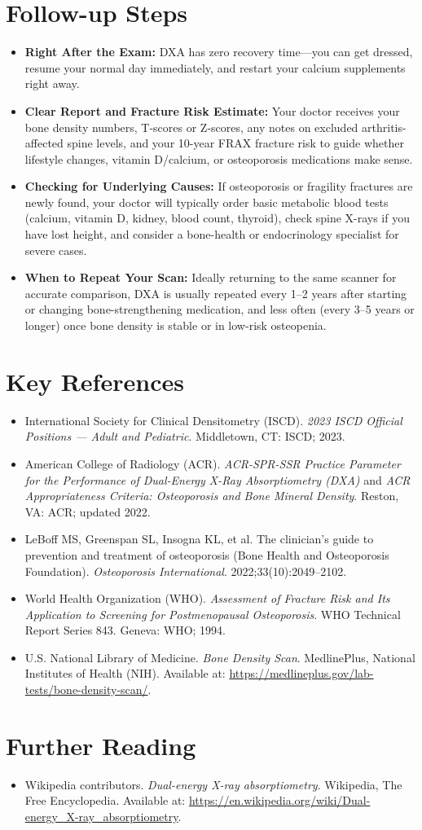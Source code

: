 \section{Follow-up Steps}
\begin{itemize}
\item \textbf{Right After the Exam:} DXA has zero recovery time---you can get dressed, resume your normal day immediately, and restart your calcium supplements right away.
\item \textbf{Clear Report and Fracture Risk Estimate:} Your doctor receives your bone density numbers, T-scores or Z-scores, any notes on excluded arthritis-affected spine levels, and your 10-year FRAX fracture risk to guide whether lifestyle changes, vitamin D/calcium, or osteoporosis medications make sense.
\item \textbf{Checking for Underlying Causes:} If osteoporosis or fragility fractures are newly found, your doctor will typically order basic metabolic blood tests (calcium, vitamin D, kidney, blood count, thyroid), check spine X-rays if you have lost height, and consider a bone-health or endocrinology specialist for severe cases.
\item \textbf{When to Repeat Your Scan:} Ideally returning to the same scanner for accurate comparison, DXA is usually repeated every 1--2 years after starting or changing bone-strengthening medication, and less often (every 3--5 years or longer) once bone density is stable or in low-risk osteopenia.
\end{itemize}

\section{Key References}
\begin{itemize}
\item International Society for Clinical Densitometry (ISCD). \textit{2023 ISCD Official Positions --- Adult and Pediatric}. Middletown, CT: ISCD; 2023.
\item American College of Radiology (ACR). \textit{ACR-SPR-SSR Practice Parameter for the Performance of Dual-Energy X-Ray Absorptiometry (DXA)} and \textit{ACR Appropriateness Criteria: Osteoporosis and Bone Mineral Density}. Reston, VA: ACR; updated 2022.
\item LeBoff MS, Greenspan SL, Insogna KL, et al. The clinician's guide to prevention and treatment of osteoporosis (Bone Health and Osteoporosis Foundation). \textit{Osteoporosis International}. 2022;33(10):2049--2102.
\item World Health Organization (WHO). \textit{Assessment of Fracture Risk and Its Application to Screening for Postmenopausal Osteoporosis}. WHO Technical Report Series 843. Geneva: WHO; 1994.
\item U.S. National Library of Medicine. \textit{Bone Density Scan}. MedlinePlus, National Institutes of Health (NIH). Available at: \url{https://medlineplus.gov/lab-tests/bone-density-scan/}.
\end{itemize}

\section{Further Reading}
\begin{itemize}
  \item Wikipedia contributors. \textit{Dual-energy X-ray absorptiometry}. Wikipedia, The Free Encyclopedia. Available at: \url{https://en.wikipedia.org/wiki/Dual-energy_X-ray_absorptiometry}.
\end{itemize}
